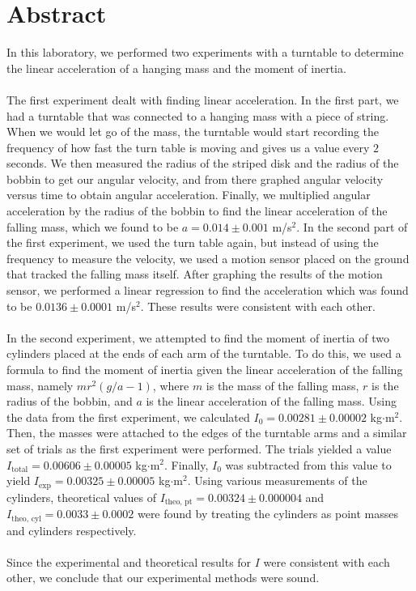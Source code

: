 \documentclass[9pt]{extarticle}
\title{}
\author{Avinash Iyer}
\date{}
\newcommand{\plain}[1]{\textrm{#1}}
\begin{document}
{
\section*{Abstract}
In this laboratory, we performed two experiments with a turntable to determine the linear acceleration of a hanging mass and the moment of inertia.\\
\\
The first experiment dealt with finding linear acceleration. In the first part, we had a turntable that was connected to a hanging mass with a piece of string. When we would let go of the mass, the turntable would start recording the frequency of how fast the turn table is moving and gives us a value every $2$ seconds. We then measured the radius of the striped disk and the radius of the bobbin to get our angular velocity, and from there graphed angular velocity versus time to obtain angular acceleration. Finally, we multiplied angular acceleration by the radius of the bobbin to find the linear acceleration of the falling mass, which we found to be $a = 0.014\pm 0.001$ m/s$^2$. In the second part of the first experiment, we used the turn table again, but instead of using the frequency to measure the velocity, we used a motion sensor placed on the ground that tracked the falling mass itself. After graphing the results of the motion sensor, we performed a linear regression to find the acceleration \textendash which was found to be $0.0136\pm 0.0001$ m/s$^2$. These results were consistent with each other.\\
\\
In the second experiment, we attempted to find the moment of inertia of two cylinders placed at the ends of each arm of the turntable. To do this, we used a formula to find the moment of inertia given the linear acceleration of the falling mass, namely $mr^2(g/a-1)$, where $m$ is the mass of the falling mass, $r$ is the radius of the bobbin, and $a$ is the linear acceleration of the falling mass. Using the data from the first experiment, we calculated $I_{0} = 0.00281\pm 0.00002$ kg$\cdot$m$^2$. Then, the masses were attached to the edges of the turntable arms and a similar set of trials as the first experiment were performed. The trials yielded a value $I_{\plain{total}} = 0.00606\pm 0.00005$ kg$\cdot$m$^2$. Finally, $I_{0}$ was subtracted from this value to yield $I_{\plain{exp}} = 0.00325\pm 0.00005$ kg$\cdot$m$^2$. Using various measurements of the cylinders, theoretical values of $I_{\plain{theo, pt}} = 0.00324\pm 0.000004$ and $I_{\plain{theo, cyl}} = 0.0033\pm 0.0002$ were found by treating the cylinders as point masses and cylinders respectively.\\
\\
Since the experimental and theoretical results for $I$ were consistent with each other, we conclude that our experimental methods were sound.
}
\end{document}
